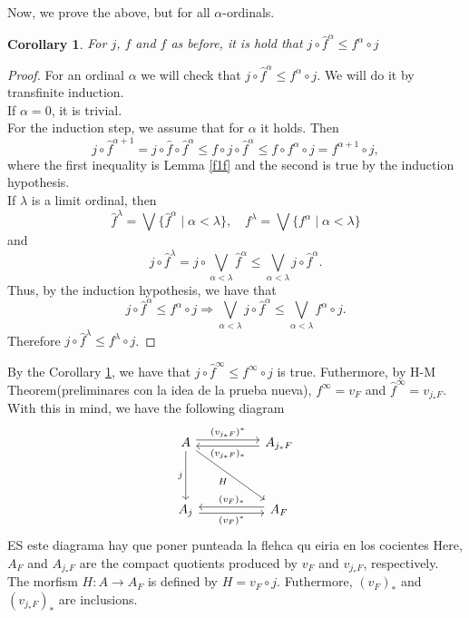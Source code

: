 \documentclass[11pt]{amsart}
\theoremstyle{plain}
\newtheorem{cor}[thm]{Corollary}
\theoremstyle{definition}
\begin{document}
Now, we prove the above, but for all $\alpha$-ordinals.\\

\begin{cor}\label{finftyf}
    For $j$, $f$ and $\hat{f}$ as before, it is hold that $j\circ \hat{f}^\alpha\leq f^\alpha\circ j$
\end{cor}

\begin{proof}
    For an ordinal $\alpha$ we will check that $j\circ \hat{f}^\alpha\leq f^\alpha\circ j$. We will do it by transfinite induction.\\

    If $\alpha=0$, it is trivial.\\

    For the induction step, we assume that for $\alpha$ it holds. Then
    \[
    j\circ \hat{f}^{\alpha+1}=j\circ \hat{f}\circ \hat{f}^{\alpha}\leq  f\circ j\circ \hat{f}^\alpha\leq f\circ f^\alpha\circ j=f^{\alpha+1}\circ j,
    \]
    where the first inequality is Lemma \ref{f1f} and the second is true by the induction hypothesis.\\

    If $\lambda$ is a limit ordinal, then
	\[
	\hat{f}^\lambda=\bigvee\{\hat{f}^\alpha\mid \alpha<\lambda\}, \quad f^\lambda=\bigvee\{f^\alpha\mid \alpha<\lambda\} 
	\]
	and 
	\[
		j\circ \hat{f}^\lambda=j\circ \bigvee_{\alpha<\lambda}\hat{f}^\alpha\leq\bigvee_{\alpha<\lambda}j\circ \hat{f}^\alpha.
	\]
	Thus, by the induction hypothesis, we have that
	\[
	j\circ \hat{f}^\alpha\leq f^\alpha\circ j\Rightarrow \bigvee_{\alpha<\lambda}j\circ \hat{f}^\alpha\leq \bigvee_{\alpha<\lambda} f^\alpha\circ j.
	\]
	Therefore $j\circ \hat{f}^\lambda\leq f^\lambda\circ j$.
\end{proof}

By the Corollary \ref{finftyf}, we have that $j\circ \hat{f}^\infty\leq f^\infty\circ j$ is true. Futhermore, by H-M Theorem(preliminares con la idea de la prueba nueva), $f^\infty=v_F$ and $\hat{f}^\infty=v_{j_*F}$. 
With this in mind, we have the following diagram
\[\begin{tikzcd}
	A && {A_{j_*F}} \\
	\\
	{A_j} && {A_F}
	\arrow["{(v_{j_*F})^*}", shift left, from=1-1, to=1-3]
	\arrow["j"', from=1-1, to=3-1]
	\arrow["H"', from=1-1, to=3-3]
	\arrow["{(v_{j_*F})_*}", shift left, from=1-3, to=1-1]
	\arrow["{(v_F)^*}"', shift right, from=3-1, to=3-3]
	\arrow["{(v_F)_*}"', shift right, from=3-3, to=3-1]
\end{tikzcd}\] ES este diagrama hay que poner punteada la flehca qu eiria en los cocientes
Here, $A_F$ and $A_{j_*F}$ are the compact quotients produced by $v_F$ and $v_{j_*F}$, respectively. The morfism $H\colon A\to A_F$ is defined by $H=v_F\circ j$. Futhermore, $(v_F)_*$ and $(v_{j_*F})_*$ are inclusions.\\
\end{document}
